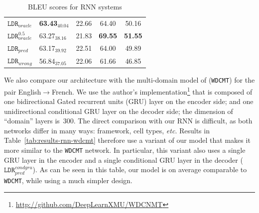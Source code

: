 \begin{table}[!h]
\begin{center}
{\begin{tabular}{|l|lcc|c|}
\hline
$\mathtt{LDR}_{oracle}$     & \bf 63.43$_{40.04}$ & 22.66 & 64.40 & 50.16\\
$\mathtt{LDR}_{oracle}^{0.5}$   & 63.27$_{38.16}$ & 21.83 & \bf 69.55 & \bf 51.55\\
$\mathtt{LDR}_{pred}$        & 63.17$_{39.92}$ & 22.51 & 64.00 & 49.89\\
$\mathtt{LDR}_{wrong}$     & 56.84$_{37.05}$ & 22.06 & 61.66 & 46.85\\
\hline
\end{tabular}
} %
\end{center}
\caption{BLEU scores for RNN systems\label{tab:results-rnn}}
\end{table}

We also compare our architecture with the multi-domain model of \cite{Zeng18multidomain} (\texttt{WDCMT}) for the pair English$\rightarrow$French. We use the author's implementation\footnote{\noindent\url{http://github.com/DeepLearnXMU/WDCNMT}} that is composed of one bidirectional Gated recurrent units (GRU) layer on the encoder side; and one unidirectional conditional GRU layer on the decoder side; the dimension of ``domain'' layers is~300.
%
The direct comparison with our RNN is difficult, as both networks differ in many ways: framework, cell types, \textit{etc}. Results in Table~\ref{tab:results-rnn-wdcmt} therefore use a variant of our model that makes it more similar to the \texttt{WDCMT} network. In particular, this variant also uses a single GRU layer in the encoder and a single conditional GRU layer in the decoder ($\mathtt{LDR}_{pred}^{condgru}$). As can be seen in this table, our model is on average comparable to \texttt{WDCMT}, while using a much simpler design.

\begin{table}[!h]
\begin{center}
\end{center}
\caption{BLEU scores for RNN systems. Comparison between \texttt{WDCMT} and $\texttt{LDR}_{pred}$ built using conditional GRUs.\label{tab:results-rnn-wdcmt}}
\end{table}

